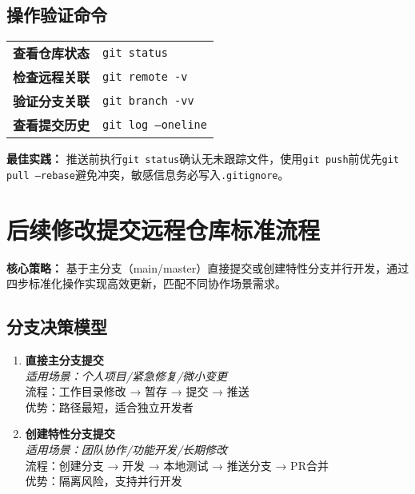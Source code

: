 \subsection{操作验证命令}
\begin{tabular}{ll}
\textbf{查看仓库状态} & \texttt{git status} \\
\textbf{检查远程关联} & \texttt{git remote -v} \\
\textbf{验证分支关联} & \texttt{git branch -vv} \\
\textbf{查看提交历史} & \texttt{git log --oneline} \\
\end{tabular}

\vspace{1em}
\textbf{最佳实践：} 推送前执行\texttt{git status}确认无未跟踪文件，使用\texttt{git push}前优先\texttt{git pull --rebase}避免冲突，敏感信息务必写入\texttt{.gitignore}。


\section{后续修改提交远程仓库标准流程}
\textbf{核心策略：}
基于主分支（main/master）直接提交或创建特性分支并行开发，通过四步标准化操作实现高效更新，匹配不同协作场景需求。

\subsection{分支决策模型}
\begin{enumerate}[leftmargin=*, nosep]
\item \textbf{直接主分支提交} \\
\textit{适用场景：个人项目/紧急修复/微小变更}\\
流程：工作目录修改 → 暂存 → 提交 → 推送\\
优势：路径最短，适合独立开发者

\item \textbf{创建特性分支提交} \\
\textit{适用场景：团队协作/功能开发/长期修改}\\
流程：创建分支 → 开发 → 本地测试 → 推送分支 → PR合并\\
优势：隔离风险，支持并行开发
\end{enumerate}


